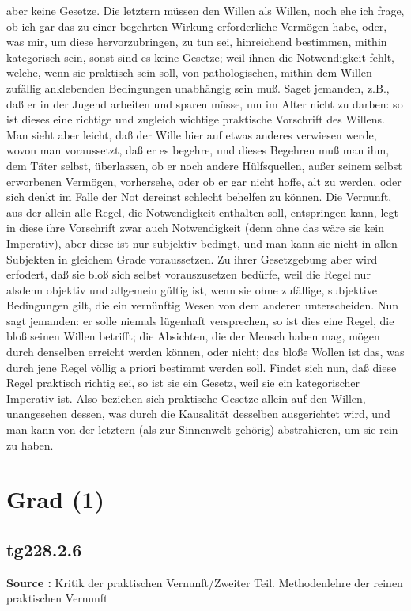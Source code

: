 \documentclass[a4paper,12pt,twoside]{book}
\newcommand{\unnumberedsection}[1]{
	\section*{#1}
	\addcontentsline{toc}{section}{#1}
	\markright{#1}
}
\begin{document}
aber keine Gesetze. Die letztern müssen den Willen als Willen, noch ehe ich frage, ob ich gar das zu einer begehrten Wirkung erforderliche Vermögen habe, oder, was mir, um diese hervorzubringen, zu tun sei, hinreichend bestimmen, mithin kategorisch sein, sonst sind es keine Gesetze; weil ihnen die Notwendigkeit fehlt, welche, wenn sie praktisch sein soll, von pathologischen, mithin dem Willen zufällig anklebenden Bedingungen unabhängig sein muß. Saget jemanden, z.B., daß er in der Jugend arbeiten und sparen müsse, um im Alter nicht  zu darben: so ist dieses eine richtige und zugleich wichtige praktische Vorschrift des Willens. Man sieht aber leicht, daß der Wille hier auf etwas anderes verwiesen werde, wovon man voraussetzt, daß er es begehre, und dieses Begehren muß man ihm, dem Täter selbst, überlassen, ob er noch andere Hülfsquellen, außer seinem selbst erworbenen Vermögen, vorhersehe, oder ob er gar nicht hoffe, alt zu werden, oder sich denkt im Falle der Not dereinst schlecht behelfen zu können. Die Vernunft, aus der allein alle Regel, die Notwendigkeit enthalten soll, entspringen kann, legt in diese ihre Vorschrift zwar auch Notwendigkeit (denn ohne das wäre sie kein Imperativ), aber diese ist nur subjektiv bedingt, und man kann sie nicht in allen Subjekten in gleichem Grade voraussetzen. Zu ihrer Gesetzgebung aber wird erfodert, daß sie bloß sich selbst vorauszusetzen bedürfe, weil die Regel nur alsdenn objektiv und allgemein gültig ist, wenn sie ohne zufällige, subjektive Bedingungen gilt, die ein vernünftig Wesen von dem anderen unterscheiden. Nun sagt jemanden: er solle niemals lügenhaft versprechen, so ist dies eine Regel, die bloß seinen Willen betrifft; die Absichten, die der Mensch haben mag, mögen durch denselben erreicht werden können, oder nicht; das bloße Wollen ist das, was durch jene Regel völlig a priori bestimmt werden soll. Findet sich nun, daß diese Regel praktisch richtig sei, so ist sie ein Gesetz, weil sie ein kategorischer Imperativ ist. Also beziehen sich praktische Gesetze allein auf den Willen, unangesehen dessen, was durch die Kausalität desselben ausgerichtet wird, und man kann von der letztern (als zur Sinnenwelt gehörig) abstrahieren, um sie rein zu haben. 
	
	\unnumberedsection{Grad (1)} 
	\subsection*{tg228.2.6} 
	\textbf{Source : }Kritik der praktischen Vernunft/Zweiter Teil. Methodenlehre der reinen praktischen Vernunft\\  
	
\end{document}
